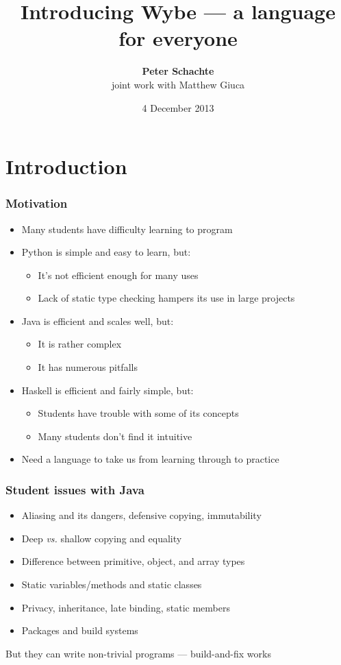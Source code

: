 \documentclass[12pt]{beamer}
\title[Introducing Wybe]{Introducing Wybe --- a language for everyone}
\author[Peter Schachte]
{\textbf{Peter Schachte}  \\
  \small joint work with Matthew Giuca}
\institute[Melbourne]{The University of Melbourne \\ Department of
  Computing and Information Systems}
\date{4 December 2013}
\begin{document}
\frame{\titlepage}

\section{Introduction}

\begin{frame}
\frametitle{Motivation}
\begin{itemize}
\item Many students have difficulty learning to program
\item Python is simple and easy to learn, but:
  \begin{itemize}
  \item It's not efficient enough for many uses
  \item Lack of static type checking hampers its use in large projects
  \end{itemize}
\item Java is efficient and scales well, but:
  \begin{itemize}
  \item It is rather complex
  \item It has numerous pitfalls
  \end{itemize}
\item Haskell is efficient and fairly simple, but:
  \begin{itemize}
  \item Students have trouble with some of its concepts
  \item Many students don't find it intuitive
  \end{itemize}
\item Need a language to take us from learning through to practice
\end{itemize}
\end{frame}

\begin{frame}
\frametitle{Student issues with Java}
\begin{itemize}
\item Aliasing and its dangers, defensive copying, immutability
\item Deep \emph{vs.} shallow copying and equality
\item Difference between primitive, object, and array types
\item Static variables/methods and static classes
\item Privacy, inheritance, late binding, static members
\item Packages and build systems
\end{itemize}

But they can write non-trivial programs --- build-and-fix works

\end{frame}
\end{document}
